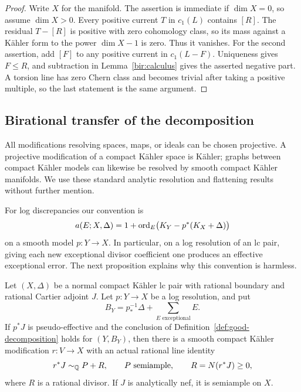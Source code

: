 \begin{proof}
Write \(X\) for the manifold. The assertion is immediate if \(\dim X=0\),
so assume \(\dim X>0\).
Every positive current \(T\) in \(c_1(L)\) contains \([R]\). The
residual \(T-[R]\) is positive with zero cohomology class, so its mass
against a Kähler form to the power \(\dim X-1\) is zero. Thus it vanishes.
For the second assertion, add \([F]\) to any positive current in
\(c_1(L-F)\). Uniqueness gives \(F\leq R\), and subtraction in
Lemma~\ref{bir:calculus} gives the asserted negative part. A torsion line
has zero Chern class and becomes trivial after taking a positive multiple,
so the last statement is the same argument.
\end{proof}

\subsection{Birational transfer of the decomposition}

All modifications resolving spaces, maps, or ideals can be chosen
projective. A projective modification of a compact Kähler space is Kähler;
graphs between compact Kähler models can likewise be resolved by smooth
compact Kähler manifolds. We use these standard analytic resolution and
flattening results without further mention.

For log discrepancies our convention is
\[
 a(E;X,\Delta)=1+\operatorname{ord}_E\bigl(K_Y-p^*(K_X+\Delta)\bigr)
\]
on a smooth model \(p:Y\to X\). In particular, on a log resolution of an
lc pair, giving each new exceptional divisor coefficient one produces an
effective exceptional error. The next proposition explains why this
convention is harmless.

\begin{proposition}\label{bir:resolution-transfer}
Let \((X,\Delta)\) be a normal compact Kähler lc pair with rational
boundary and rational Cartier adjoint \(J\). Let \(p:Y\to X\) be a log
resolution, and put
\[
 B_Y=p_*^{-1}\Delta+\sum_{E\text{ exceptional}}E.
\]
If \(p^*J\) is pseudo-effective and the conclusion of
Definition~\ref{def:good-decomposition} holds for \((Y,B_Y)\), then there
is a smooth compact Kähler modification \(r:V\to X\) with an actual
rational line identity
\[
 r^*J\sim_{\mathbb Q}P+R,\qquad P\text{ semiample},\qquad
 R=N(r^*J)\geq0,
\]
where \(R\) is a rational divisor.
If \(J\) is analytically nef, it is semiample on \(X\).
\end{proposition}

